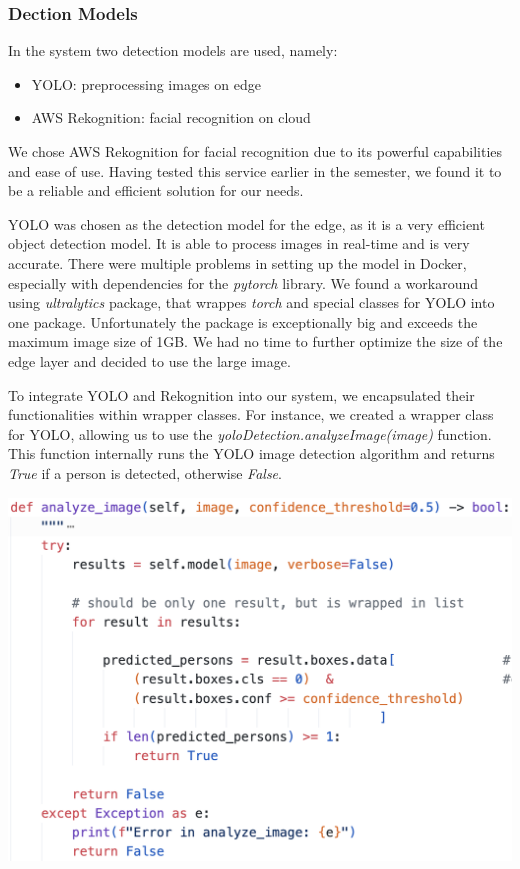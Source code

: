 \documentclass[conference]{IEEEtran}
\begin{document}
\subsubsection{Dection Models}
In the system two detection models are used, namely: 
\begin{itemize}
\item YOLO: preprocessing images on edge
\item AWS Rekognition: facial recognition on cloud
\end{itemize}

\hfill \break

We chose AWS Rekognition for facial recognition due to its powerful capabilities and ease of use. Having tested this service earlier in the semester, we found it to be a reliable and efficient solution for our needs.

YOLO was chosen as the detection model for the edge, as it is a very efficient object detection model. It is able to process images in real-time and is very accurate. There were multiple problems in setting up the model in Docker, especially with dependencies for the \textit{pytorch} library. We found a workaround using \textit{ultralytics} package, that wrappes \textit{torch} and special classes for YOLO into one package. Unfortunately the package is exceptionally big and exceeds the maximum image size of 1GB. We had no time to further optimize the size of the edge layer and decided to use the large image. 

To integrate YOLO and Rekognition into our system, we encapsulated their functionalities within wrapper classes. For instance, we created a wrapper class for YOLO, allowing us to use the \textit{yoloDetection.analyzeImage(image)} function. This function internally runs the YOLO image detection algorithm and returns \textit{True} if a person is detected, otherwise \textit{False}.

\begin{center}
\includegraphics[width=1\linewidth]{res/analyze_image-function.png}
\end{center}
\end{document}
